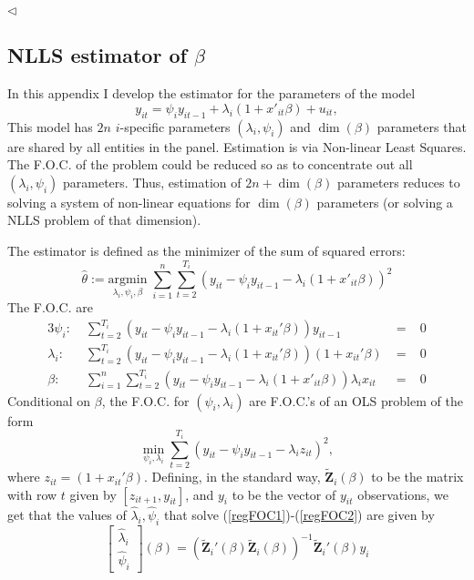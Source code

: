 \documentclass[12pt,pagebackref]{article}
\begin{document}
\begin{flushright}
$\triangleleft$
\end{flushright}

\newpage

\hypertarget{nlls-estimator-of-beta}{%
\subsection{\texorpdfstring{NLLS estimator of
\(\beta\)}{NLLS estimator of \textbackslash{}beta}}\label{nlls-estimator-of-beta}}

In this appendix I develop the estimator for the parameters of the model
\begin{equation}\label{nonLinearLS}
 y_{it} = \psi_i y_{it-1} + \lambda_i(1+x'_{it}\beta) + u_{it},
\end{equation} This model has \(2n\) \(i\)-specific parameters
\((\lambda_i, \psi_i)\) and \(\dim(\beta)\) parameters that are shared
by all entities in the panel. Estimation is via Non-linear Least
Squares. The F.O.C. of the problem could be reduced so as to concentrate
out all \((\lambda_i,\psi_i)\) parameters. Thus, estimation of
\(2n + \dim(\beta)\) parameters reduces to solving a system of
non-linear equations for \(\dim(\beta)\) parameters (or solving a NLLS
problem of that dimension).

The estimator is defined as the minimizer of the sum of squared errors:
\begin{equation}\label{sse}
 \hat \theta := \underset{\lambda_i, \psi_i, \beta}{\mathrm{argmin}}\;
 \sum_{i=1}^n \sum_{t=2}^{T_i} (y_{it} - \psi_i y_{it-1} - \lambda_i(1+x'_{it}\beta))^2
\end{equation} The F.O.C. are \begin{alignat}{3}
\label{regFOC1} \psi_i:\; & \sum_{t=2}^{T_i} (y_{it} - \psi_iy_{it-1} - \lambda_i(1+x_{it}'\beta))y_{it-1} &\;=\;& 0\\
\label{regFOC2} \lambda_i:\; &\sum_{t=2}^{T_i} (y_{it} - \psi_iy_{it-1} - \lambda_i(1+x_{it}'\beta))(1+x_{it}'\beta) &\;=\;& 0 \\
  \beta:\; & \sum_{i=1}^n \sum_{t=2}^{T_i} (y_{it} - \psi_i y_{it-1} - \lambda_i(1+x'_{it}\beta))\lambda_ix_{it} &\;=\;& 0
\end{alignat} Conditional on \(\beta\), the F.O.C. for
\((\psi_i, \lambda_i)\) are F.O.C.'s of an OLS problem of the form
\[\min_{\psi_i, \lambda_i}\sum_{t=2}^{T_i} (y_{it} - \psi_i y_{it-1} - \lambda_iz_{it})^2,\]
where \(z_{it} = (1+x_{it}'\beta)\). Defining, in the standard way,
\(\tilde{\mathbf Z}_i (\beta)\) to be the matrix with row \(t\) given by
\([z_{it+1}, y_{it}]\), and \(y_i\) to be the vector of \(y_{it}\)
observations, we get that the values of \(\hat \lambda_i,\hat \psi_i\)
that solve (\ref{regFOC1})-(\ref{regFOC2}) are given by
\begin{equation}\label{psilambda}
\begin{bmatrix}
\hat \lambda_i \\
\hat \psi_i
\end{bmatrix}(\beta)
=
(\tilde{\mathbf Z}_i' (\beta)\tilde{\mathbf Z}_i (\beta))^{-1}\tilde{\mathbf Z}_i' (\beta)y_i
\end{equation}
\end{document}
